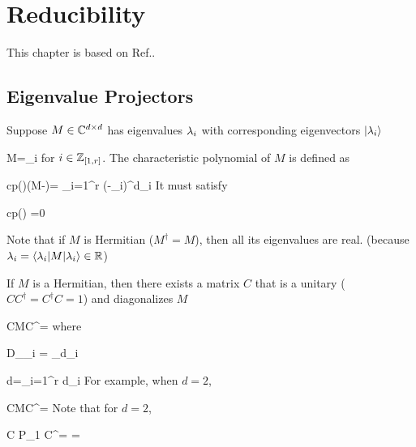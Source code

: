 \chapter{Reducibility}
\label{ch-reducibility}

This chapter is based on
Ref.\cite{birdtracks-book}.

\section{Eigenvalue Projectors}

Suppose $M\in { \mathbb{C}}^{d\times d }$ 
has eigenvalues 
$\lambda_i$ with corresponding eigenvectors $|\lambda_i\rangle$

\beq
M=\lam_i 
\eeq
for $i\in {\mathbb{Z}}_{[1,r]}$.
The characteristic polynomial of $M$ is
defined as

\beq
cp(\lam)\eqdef \det(M-\lam)= \prod_{i=1}^r (\lam-\lam_i)^{d_i}
\eeq
It must satisfy

\beq
cp(\lam) =0
\eeq

Note 
that if $M$ is Hermitian 
($M^\dagger=M$),
then all its eigenvalues  are real. (because $\lambda_i =
\left\langle\lambda_i|M|\lambda_i\right\rangle\in{ \mathbb{R}}$)




If $M$ is a Hermitian, then there exists
a matrix $C$ that is a unitary ($CC^\dagger = C^\dagger C =1$)
and diagonalizes $M$

\beq
CMC^\dagger=
\eeq
where

\beq
D_{\lam_i} =
_{d_i}
\eeq

\beq
d=\sum_{i=1}^r d_i
\eeq
For example,
when $d=2$, 


\beq
CMC^\dagger =
\eeq
Note that for $d=2$,

\beq
C P_1 C^\dagger=
\left[
\begin{array}{cc}
1&0
\\
0&0
\end{array}
\right]
=
\eeq

